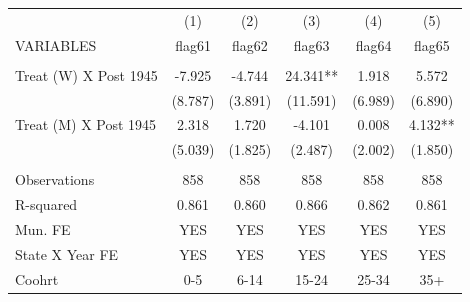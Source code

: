 \begin{tabular}{lccccc} \hline
 & (1) & (2) & (3) & (4) & (5) \\
VARIABLES & flag61 & flag62 & flag63 & flag64 & flag65 \\ \hline
 &  &  &  &  &  \\
Treat (W) X Post 1945 & -7.925 & -4.744 & 24.341** & 1.918 & 5.572 \\
 & (8.787) & (3.891) & (11.591) & (6.989) & (6.890) \\
Treat (M) X Post 1945 & 2.318 & 1.720 & -4.101 & 0.008 & 4.132** \\
 & (5.039) & (1.825) & (2.487) & (2.002) & (1.850) \\
 &  &  &  &  &  \\
Observations & 858 & 858 & 858 & 858 & 858 \\
R-squared & 0.861 & 0.860 & 0.866 & 0.862 & 0.861 \\
Mun. FE & YES & YES & YES & YES & YES \\
State X Year FE & YES & YES & YES & YES & YES \\
 Coohrt & 0-5 & 6-14 & 15-24 & 25-34 & 35+ \\ \hline
\end{tabular}

